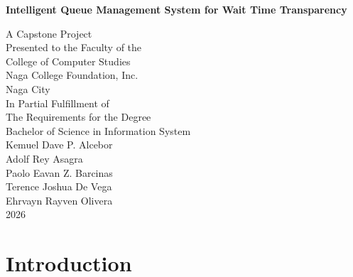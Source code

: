 \documentclass{research}
\title{}
\author{Fritzgerald Enric T. Imperial}
\begin{document}
\thispagestyle{empty}
\begin{center}
  \vspace*{1in}
  {\Huge\bfseries Intelligent Queue Management System for Wait Time Transparency \par}
  \vspace{1in}
  A Capstone Project\\
  Presented to the Faculty of the\\
  College of Computer Studies\\
  Naga College Foundation, Inc.\\
  Naga City\\
  \vspace{1in}
  In Partial Fulfillment of\\
  The Requirements for the Degree\\
  Bachelor of Science in Information System\\
  \vspace{0.5in}
  Kemuel Dave P. Alcebor\\
  Adolf Rey Asagra\\
  Paolo Eavan Z. Barcinas\\
  Terence Joshua De Vega\\
  Ehrvayn Rayven Olivera\\
  \vspace*{0.5in}
  2026
\end{center}
\clearpage



\tableofcontents

\clearpage

\listoffigures

\clearpage

\listoftables

\clearpage

\chapter{Introduction}
\end{document}
